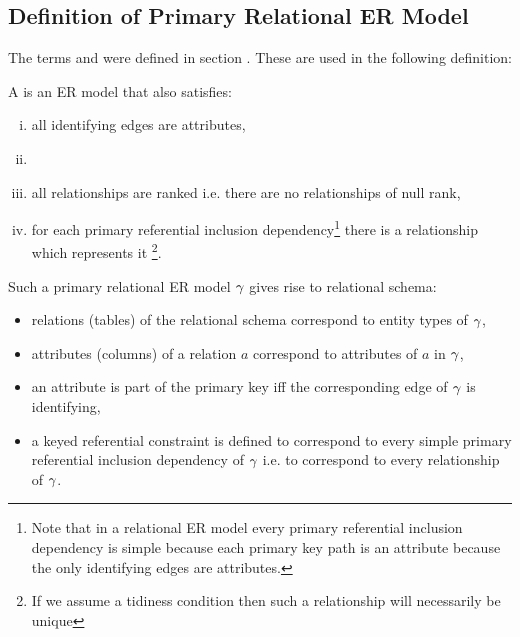 \subsection{Definition of Primary Relational ER Model}
The terms  and  were defined in section . 
These are used in the following definition:
\begin{definition}
\noindent 
A  is an  ER model that also satisfies:
\begin{enumerate}[(i)]
\item
{}all identifying edges are attributes, 
\item {}
\item
all relationships are ranked i.e. there are no relationships of null rank,
\item 
for each  primary referential inclusion dependency\footnote{Note that in a relational ER model every primary referential inclusion dependency is simple because each primary key path is an attribute because the only identifying edges are attributes.} there is a relationship which represents it
\footnote{If we assume a tidiness condition then such a relationship will necessarily be unique}.
\end{enumerate} 
\end{definition}

Such a primary relational ER model $\gamma$ gives rise to relational schema:
\begin{itemize}
\item relations (tables) of the relational schema correspond to entity types of $\gamma$,
\item attributes (columns) of a relation $a$ correspond to attributes of $a$ in $\gamma$, 
\item an attribute is part of the primary key iff the corresponding edge of $\gamma$ is identifying,
\item a keyed referential constraint is defined to correspond to every simple primary referential inclusion dependency of $\gamma$ i.e. to correspond to every relationship of $\gamma$. 
\end{itemize}

